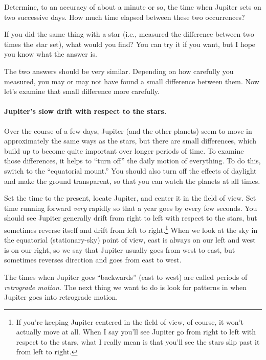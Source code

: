 Determine, to an accuracy of about a minute or so, the time when Jupiter sets
on two successive days. How much time elapsed between these two occurrences?

\answerspace{1.5in}

If you did the same thing with a star (i.e., measured the difference between
two times the star set), what would you find? You can try it if you want,
but I hope you know what the answer is.

\answerspace{2in}


The two answers should be very similar. Depending on how carefully you 
measured, you may or may not have found a small difference between them.
Now let's examine that small difference more carefully.

\paragraph{Jupiter's slow drift with respect to the stars.}
Over the course of a few days, Jupiter (and the other planets) seem to
move in approximately the same ways as the stars, but there are 
small differences, which build up to become quite important
over longer periods of time. To examine those differences,
it helps to ``turn off'' the daily motion of everything.
To do this, switch to the ``equatorial mount.''
You should also turn off the effects of daylight and make the ground
transparent,
so that you can watch the planets at all times.


Set the time to the present, locate Jupiter, and center it in the field
of view. Set time running forward \textit{very} rapidly so that a year goes by
every few seconds. You should see Jupiter generally drift from right
to left with respect to the stars, but sometimes reverse itself
and drift from left to right.\footnote{If you're keeping Jupiter 
centered in the field of view, of course, it won't actually move at all.
When I say you'll see Jupiter go from right to left
with respect to the stars, what I really mean
is that you'll see the stars slip past it from left to right.}
When we look at the sky in the equatorial (stationary-sky) point of view, 
east is always on
our left and west is on our right, so we say that Jupiter
usually goes from west to east, but sometimes reverses direction and
goes from east to west.

The times when Jupiter goes ``backwards'' (east to west) are called
periods of \textit{retrograde motion}. The next thing we want to 
do is look for patterns in when Jupiter goes into retrograde motion.


